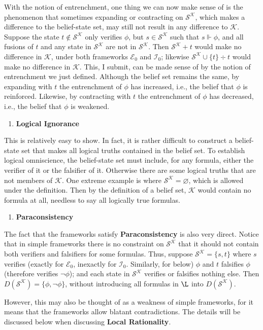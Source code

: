 \documentclass[12pt]{article}
\newcommand{\ver}{\Vdash}
\newcommand{\K}{\mathcal{K}}
\newcommand{\SK}{\mathcal{S}^\mathcal{K}}
\begin{document}
\par
With the notion of entrenchment, one thing we can now make sense of is the phenomenon that sometimes expanding or contracting on $\SK$, which makes a difference to the belief-state set, may still not result in any difference to $\K$. Suppose the state $t \notin \SK$ only verifies $\phi$, but $s \in \SK$ such that $s \ver \phi$, and all fusions of $t$ and any state in $\SK$ are not in $\SK$. Then $\SK + t$ would make no difference in $\K$, under both frameworks $\mathcal{E}_0$ and $\mathcal{I}_0$; likewise $\SK \cup \{ t \} \div t$ would make no difference in $\K$. This, I submit, can be made sense of by the notion of entrenchment we just defined. Although the belief set remains the same, by expanding with $t$ the entrenchment of $\phi$ has increased, i.e., the belief that $\phi$ is reinforced. Likewise, by contracting with $t$ the entrenchment of $\phi$ has decreased, i.e., the belief that $\phi$ is weakened. 
\begin{enumerate}
    \item[(D2)] \textbf{Logical Ignorance}
\end{enumerate}
This is relatively easy to show. In fact, it is rather difficult to construct a belief-state set that makes all logical truths contained in the belief set. To establish logical omniscience, the belief-state set must include, for any formula, either the verifier of it or the falsifier of it. Otherwise there are some logical truths that are not members of $\K$. One extreme example is where $\SK = \varnothing$, which is allowed under the definition. Then by the definition of a belief set, $\K$ would contain no formula at all, needless to say all logically true formulas. 
\begin{enumerate}
    \item[(D3)] \textbf{Paraconsistency}
\end{enumerate}
The fact that the frameworks satisfy \textbf{Paraconsistency} is also very direct. Notice that in simple frameworks there is no constraint on $\SK$ that it should not contain both verifiers and falsifiers for some formulas. Thus, suppose $\SK = \{s, t\}$ where $s$ verifies (exactly for $\mathcal{E}_0$, inexactly for $\mathcal{I}_0$. Similarly, for below) $\phi$ and $t$ falsifies $\phi$ (therefore verifies $\lnot \phi$); and each state in $\SK$ verifies or falsifies nothing else. Then $D(\SK) = \{\phi, \lnot \phi \}$, without introducing all formulas in $\L$ into $D(\SK)$. 
\par
However, this may also be thought of as a weakness of simple frameworks, for it means that the frameworks allow blatant contradictions. The details will be discussed below when discussing \textbf{Local Rationality}.
\end{document}
